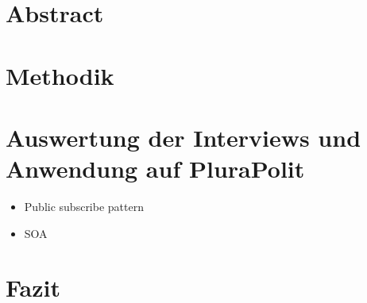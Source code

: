 \documentclass[a4paper, 12pt, headsepline]{scrartcl}
\begin{document}


\newpage
{}

\section*{Abstract}

\newpage

\tableofcontents

\newpage
{}
\setcounter{page}{1}


\newpage



\section{Methodik}
\section{Auswertung der Interviews und Anwendung auf PluraPolit}
\begin{itemize}
	\item Public subscribe pattern
	\item SOA 
\end{itemize}

\section{Fazit}

\newpage

\printbibliography[title=Literaturverzeichnis]

\newpage

\listoffigures

\newpage


\end{document}
